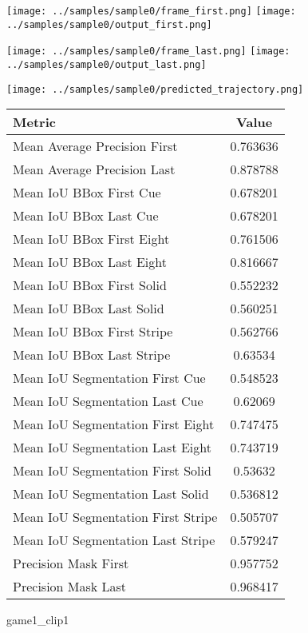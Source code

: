 

\begin{figure}
\texttt{[image: ../samples/sample0/frame\_first.png]}
\texttt{[image: ../samples/sample0/output\_first.png]}\par
\texttt{[image: ../samples/sample0/frame\_last.png]}
\texttt{[image: ../samples/sample0/output\_last.png]}\par
\centering
\texttt{[image: ../samples/sample0/predicted\_trajectory.png]}
\caption{game1\_clip1}
\vspace{10pt}
\begin{tabular}{|l|c|}
\hline
\textbf{Metric} & \textbf{Value} \\
\hline
Mean Average Precision First & 0.763636 \\
Mean Average Precision Last & 0.878788 \\
\hline
Mean IoU BBox First Cue & 0.678201 \\
Mean IoU BBox Last Cue & 0.678201 \\
Mean IoU BBox First Eight & 0.761506 \\
Mean IoU BBox Last Eight & 0.816667 \\
Mean IoU BBox First Solid & 0.552232 \\
Mean IoU BBox Last Solid & 0.560251 \\
Mean IoU BBox First Stripe & 0.562766 \\
Mean IoU BBox Last Stripe & 0.63534 \\
\hline
Mean IoU Segmentation First Cue & 0.548523 \\
Mean IoU Segmentation Last Cue & 0.62069 \\
Mean IoU Segmentation First Eight & 0.747475 \\
Mean IoU Segmentation Last Eight & 0.743719 \\
Mean IoU Segmentation First Solid & 0.53632 \\
Mean IoU Segmentation Last Solid & 0.536812 \\
Mean IoU Segmentation First Stripe & 0.505707 \\
Mean IoU Segmentation Last Stripe & 0.579247 \\
\hline
Precision Mask First & 0.957752 \\
Precision Mask Last & 0.968417 \\
\hline
\end{tabular} 
\end{figure}

